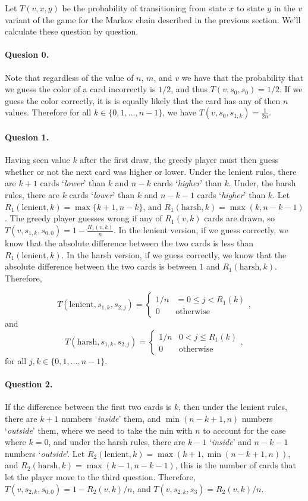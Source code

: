\documentclass[12pt]{article}
\theoremstyle{definition}
\begin{document}
Let $T(v, x, y)$ be the probability of transitioning from state $x$ to state $y$ in the $v$ variant of the game for the Markov chain described in the previous section. We'll calculate these question by question.

\paragraph{Quesion 0.} Note that regardless of the value of $n$, $m$, and $v$ we have that the probability that we guess the color of a card incorrectly is $1/2$, and thus $T(v, s_{0}, s_{0}) = 1/2$. If we guess the color correctly, it is is equally likely that the card has any of then $n$ values. Therefore for all $k \in \{0, 1,...,n-1\}$, we have $T(v, s_{0}, s_{1, k}) = \frac{1}{2n}$.

\paragraph{Quesion 1.} Having seen value $k$ after the first draw, the greedy player must then guess whether or not the next card was higher or lower. Under the lenient rules, there are $k+1$ cards `\textit{lower}' than $k$ and $n-k$ cards `\textit{higher}' than $k$. Under, the harsh rules, there are $k$ cards `\textit{lower}' than $k$ and $n-k-1$ cards `\textit{higher}' than $k$.  Let $R_1(\text{lenient}, k) = \max\{k+1, n-k\}$, and $R_1(\text{harsh}, k) = \max(k, n-k-1)$. The greedy player guesses wrong if any of $R_1(v, k)$ cards are drawn, so $T(v, s_{1, k}, s_{0,0}) = 1 - \frac{R_1(v, k)}{n}$. In the lenient version, if we guess correctly, we know that the absolute difference between the two cards is less than $R_1(\text{lenient}, k)$. In the harsh version, if we guess correctly, we know that the absolute difference between the two cards is between $1$ and $R_1(\text{harsh}, k)$. Therefore,

$$
T(\text{lenient}, s_{1,k}, s_{2, j}) = \begin{cases}
    1/n & = 0 \leq j < R_1(k)\\
    0 & \text{otherwise}
\end{cases},
$$
and
$$
T(\text{harsh}, s_{1,k}, s_{2, j}) = \begin{cases}
    1/n & 0 < j \leq R_1(k)\\
    0 & \text{otherwise}
\end{cases},
$$
for all $j, k \in \{0,1,...,n-1\}$.

\paragraph{Question 2.} If the difference between the first two cards is $k$, then under the lenient rules, there are $k+1$ numbers `\textit{inside}' them, and $\min(n-k+1, n)$ numbers `\textit{outside}' them, where we need to take the min with $n$ to account for the case where $k=0$, and under the harsh rules, there are $k-1$ `\textit{inside}' and $n-k-1$ numbers `\textit{outside}'. Let $R_2(\text{lenient}, k) = \max(k+1, \min(n-k+1, n))$, and $R_2(\text{harsh}, k) = \max(k-1, n-k-1)$, this is the number of cards that let the player move to the third question. Therefore, $T(v, s_{2, k}, s_{0,0}) = 1 - R_2(v, k) / n$, and $T(v, s_{2, k}, s_{3}) = R_2(v, k)/n$.
\end{document}
